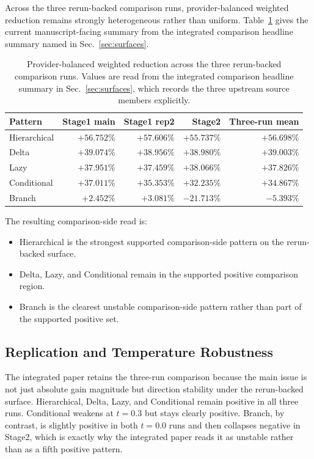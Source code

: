 \documentclass[11pt,a4paper]{article}
\begin{document}
Across the three rerun-backed comparison runs, provider-balanced weighted reduction remains strongly heterogeneous rather than uniform. Table~\ref{tab:comparison_summary} gives the current manuscript-facing summary from the integrated comparison headline summary named in Sec.~\ref{sec:surfaces}.
\begin{table}[t]
\centering
\small
\begin{tabular}{p{2.6cm}rrrr}
\toprule
\textbf{Pattern} & \textbf{Stage1 main} & \textbf{Stage1 rep2} & \textbf{Stage2} & \textbf{Three-run mean} \\
\midrule
Hierarchical & \(+56.752\%\) & \(+57.606\%\) & \(+55.737\%\) & \(+56.698\%\) \\
Delta & \(+39.074\%\) & \(+38.956\%\) & \(+38.980\%\) & \(+39.003\%\) \\
Lazy & \(+37.951\%\) & \(+37.459\%\) & \(+38.066\%\) & \(+37.826\%\) \\
Conditional & \(+37.011\%\) & \(+35.353\%\) & \(+32.235\%\) & \(+34.867\%\) \\
Branch & \(+2.452\%\) & \(+3.081\%\) & \(-21.713\%\) & \(-5.393\%\) \\
\bottomrule
\end{tabular}
\caption{Provider-balanced weighted reduction across the three rerun-backed comparison runs. Values are read from the integrated comparison headline summary in Sec.~\ref{sec:surfaces}, which records the three upstream source members explicitly.}
\label{tab:comparison_summary}
\end{table}

The resulting comparison-side read is:
\begin{itemize}
  \item Hierarchical is the strongest supported comparison-side pattern on the rerun-backed surface.
  \item Delta, Lazy, and Conditional remain in the supported positive comparison region.
  \item Branch is the clearest unstable comparison-side pattern rather than part of the supported positive set.
\end{itemize}

\subsection{Replication and Temperature Robustness}

The integrated paper retains the three-run comparison because the main issue is not just absolute gain magnitude but direction stability under the rerun-backed surface. Hierarchical, Delta, Lazy, and Conditional remain positive in all three runs. Conditional weakens at \(t=0.3\) but stays clearly positive. Branch, by contrast, is slightly positive in both \(t=0.0\) runs and then collapses negative in Stage2, which is exactly why the integrated paper reads it as unstable rather than as a fifth positive pattern.
\end{document}
